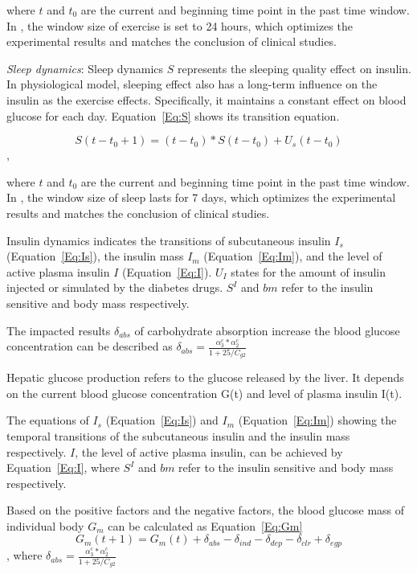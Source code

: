 where $t$ and $t_0$ are the current and beginning time point in the past time window. In \sysname,
the window size of exercise is set to 24 hours, which optimizes the experimental results and matches the conclusion
of clinical studies.

\emph{Sleep dynamics}: Sleep dynamics $S$ represents the sleeping quality effect on insulin. In physiological model, sleeping
effect also has a long-term influence on the insulin as the exercise effects. Specifically, it maintains a constant effect on 
blood glucose for each day. Equation~\ref{Eq:S} shows its transition equation.

\begin{equation}\label{Eq:S}
S(t-t_0+1)=(t-t_0)*S(t-t_0)+U_{s}(t-t_0)
\end{equation},

where $t$ and $t_0$ are the current and beginning time point in the past time window. 
In \sysname, the window size of sleep lasts for 7 days, which optimizes the experimental results and matches the conclusion
of clinical studies.


Insulin dynamics indicates the transitions of subcutaneous insulin $I_{s}$ (Equation~\ref{Eq:Is}),
the insulin mass $I_{m}$ (Equation~\ref{Eq:Im}),  and the level of active plasma insulin $I$ (Equation~\ref{Eq:I}). $U_{I}$
states for the amount of insulin injected or simulated by the diabetes drugs. $S^I$ and $bm$ refer to the insulin sensitive
and body mass respectively.


The impacted results $\delta_{abs}$ of carbohydrate absorption increase the blood glucose concentration can be described as 
$\delta_{abs}=\frac{\alpha_3^c*\alpha_2^c}{1+25/C_{g2}}$

Hepatic glucose production refers to the glucose released by the liver. It depends on the current blood glucose concentration G(t) 
and level of plasma insulin I(t).


The equations of $I_{s}$ (Equation~\ref{Eq:Is}) and $I_{m}$ (Equation~\ref{Eq:Im}) showing the temporal transitions of  the subcutaneous insulin
and the insulin mass respectively. $I$, the level of active plasma insulin, can be achieved by Equation~\ref{Eq:I}, where $S^I$ and $bm$ refer to the
insulin sensitive and body mass respectively.





Based on the positive factors and the negative factors, the blood glucose mass of individual body
$G_m$ can be calculated as Equation~\ref{Eq:Gm}
\begin{equation}\label{Eq:Gm}
G_m(t+1)=G_m(t)+\delta_{abs}-\delta_{ind}-\delta_{dep}-\delta_{clr}+\delta_{egp}
\end{equation},
where $\delta_{abs}=\frac{\alpha_3^c*\alpha_2^c}{1+25/C_{g2}}$

